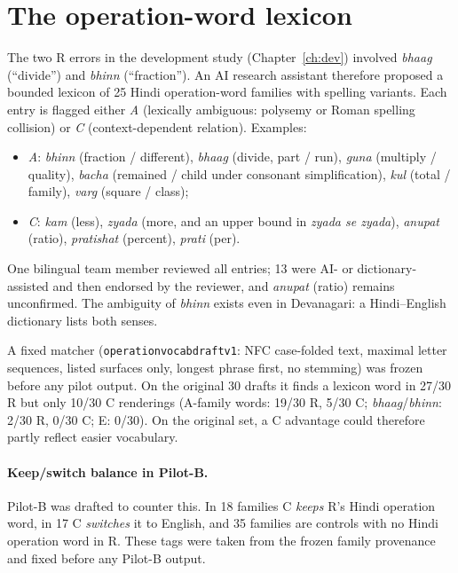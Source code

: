 \documentclass[12pt,a4paper,oneside]{report}
\renewcommand{\_}{\oldunderscore\allowbreak}
\begin{document}
\section{The operation-word lexicon}
\label{sec:lexicon}

The two R errors in the development study (Chapter~\ref{ch:dev}) involved \emph{bhaag} (``divide'') and \emph{bhinn} (``fraction''). An AI research assistant therefore proposed a bounded lexicon of 25 Hindi operation-word families with spelling variants. Each entry is flagged either \emph{A} (lexically ambiguous: polysemy or Roman spelling collision) or \emph{C} (context-dependent relation). Examples:
\begin{itemize}[nosep]
\item \emph{A}: \emph{bhinn} (fraction / different), \emph{bhaag} (divide, part / run), \emph{guna} (multiply / quality), \emph{bacha} (remained / child under consonant simplification), \emph{kul} (total / family), \emph{varg} (square / class);
\item \emph{C}: \emph{kam} (less), \emph{zyada} (more, and an upper bound in \emph{zyada se zyada}), \emph{anupat} (ratio), \emph{pratishat} (percent), \emph{prati} (per).
\end{itemize}
One bilingual team member reviewed all entries; 13 were AI- or dictionary-assisted and then endorsed by the reviewer, and \emph{anupat} (ratio) remains unconfirmed. The ambiguity of \emph{bhinn} exists even in Devanagari: a Hindi--English dictionary lists both senses.

A fixed matcher (\texttt{operation\_vocab\_draft\_v1}: NFC case-folded text, maximal letter sequences, listed surfaces only, longest phrase first, no stemming) was frozen before any pilot output. On the original 30 drafts it finds a lexicon word in 27/30 R but only 10/30 C renderings (A-family words: 19/30 R, 5/30 C; \emph{bhaag}/\emph{bhinn}: 2/30 R, 0/30 C; E: 0/30). On the original set, a C advantage could therefore partly reflect easier vocabulary.

\paragraph{Keep/switch balance in Pilot-B.} Pilot-B was drafted to counter this. In 18 families C \emph{keeps} R's Hindi operation word, in 17 C \emph{switches} it to English, and 35 families are controls with no Hindi operation word in R. These tags were taken from the frozen family provenance and fixed before any Pilot-B output.
\end{document}
